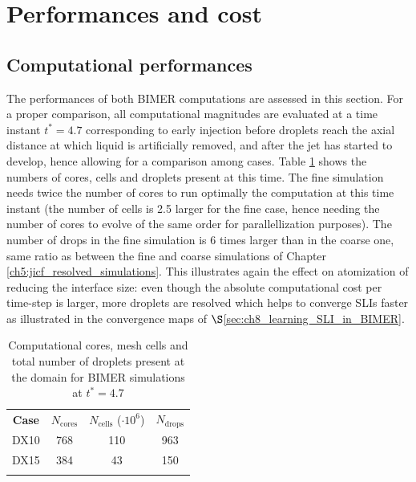 \clearpage

\section{Performances and cost}
\label{sec:ch8_BIMER_performances_cost}


\subsection{Computational performances}

The performances of both BIMER computations are assessed in this section. For a proper comparison, all computational magnitudes are evaluated at a time instant $t^* = 4.7$ corresponding to early injection before droplets reach the axial distance at which liquid is artificially removed, and after the jet has started to develop, hence allowing for a comparison among cases. Table \ref{tab:BIMER_Ncores_Ncells_Ndrops} shows the numbers of cores, cells and droplets present at this time. The fine simulation needs twice the number of cores to run optimally the computation at this time instant (the number of cells is 2.5 larger for the fine case, hence needing the number of cores to evolve of the same order for parallellization purposes). The number of drops in the fine simulation is 6 times larger than in the coarse one, same ratio as between the fine and coarse simulations of Chapter \ref{ch5:jicf_resolved_simulations}. This illustrates again the effect on atomization of reducing the interface size: even though the absolute computational cost per time-step is larger, more droplets are resolved which helps to converge SLIs faster as illustrated in the convergence maps of $\S$\ref{sec:ch8_learning_SLI_in_BIMER}. 



\begin{table}[!h]
\centering
\caption{Computational cores, mesh cells and total number of droplets present at the domain for BIMER simulations at $t^* = 4.7$}
\begin{tabular}{cccc}
\thickhline
\textbf{Case} &  $N_\mathrm{cores}$ & $N_\mathrm{cells}$ ($\cdot 10^6$) & $N_\mathrm{drops}$\\
\thickhline 
DX10 & 768  & 110 & 963 \\ %
DX15 & 384 & 43 & 150  \\ %
\thickhline
\end{tabular}
\label{tab:BIMER_Ncores_Ncells_Ndrops}
\end{table}

